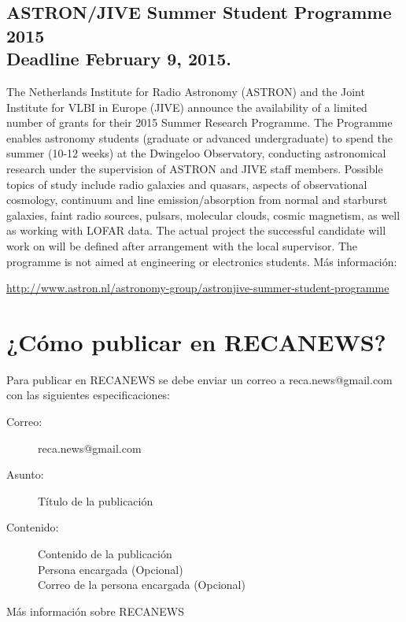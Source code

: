 \documentclass{book}
\begin{document}
\subsection{ASTRON/JIVE Summer Student Programme 2015\\ Deadline February 9, 2015.}

The Netherlands Institute for Radio Astronomy (ASTRON) and the Joint Institute for VLBI in Europe (JIVE) announce the availability of a limited number of grants for their 2015 Summer Research Programme. The Programme enables astronomy students (graduate or advanced undergraduate) to spend the summer (10-12 weeks) at the Dwingeloo Observatory, conducting astronomical research under the supervision of ASTRON and JIVE staff members. Possible topics of study include radio galaxies and quasars, aspects of observational cosmology, continuum and line emission/absorption from normal and starburst galaxies, faint radio sources, pulsars, molecular clouds, cosmic magnetism, as well as working with LOFAR data. The actual project the successful candidate will work on will be defined after arrangement with the local supervisor. The programme is not aimed at engineering or electronics students.
\noindent Más información: \begin{center}
\url{http://www.astron.nl/astronomy-group/astronjive-summer-student-programme}
\end{center}


\section*{¿Cómo publicar en RECANEWS?}

Para publicar en RECANEWS se debe enviar un correo a reca.news@gmail.com con las siguientes especificaciones:
\begin{description}
\item[Correo:]reca.news@gmail.com
\item[Asunto:]Título de la publicación
\item[Contenido:]Contenido de la publicación\\
Persona encargada (Opcional)\\
Correo de la persona encargada (Opcional)
\end{description}
  
\noindent Más información sobre RECANEWS
\end{document}
